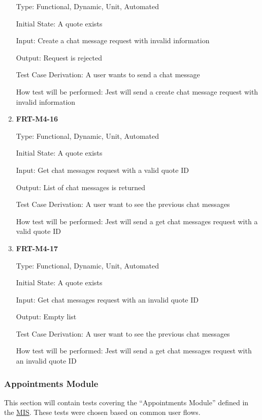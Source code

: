 \documentclass[12pt, titlepage]{article}
\begin{document}
\begin{enumerate}
	      Type: Functional, Dynamic, Unit, Automated

	      Initial State: A quote exists

	      Input: Create a chat message request with invalid information

	      Output: Request is rejected

	      Test Case Derivation: A user wants to send a chat message

	      How test will be performed: Jest will send a create chat message request with invalid information

	\item \textbf{FRT-M4-16}

	      Type: Functional, Dynamic, Unit, Automated

	      Initial State: A quote exists

	      Input: Get chat messages request with a valid quote ID

	      Output: List of chat messages is returned

	      Test Case Derivation: A user want to see the previous chat messages

	      How test will be performed: Jest will send a get chat messages request with a valid quote ID

	\item \textbf{FRT-M4-17}

	      Type: Functional, Dynamic, Unit, Automated

	      Initial State: A quote exists

	      Input: Get chat messages request with an invalid quote ID

	      Output: Empty list

	      Test Case Derivation: A user want to see the previous chat messages

	      How test will be performed: Jest will send a get chat messages request with an invalid quote ID

\end{enumerate}

\subsubsection{Appointments Module}

This section will contain tests covering the ``Appointments Module'' defined in the
\href{https://github.com/arkinmodi/project-sayyara/blob/main/docs/Design/SoftDetailedDes/MIS.pdf}{MIS}.
These tests were chosen based on common user flows.
\end{document}
